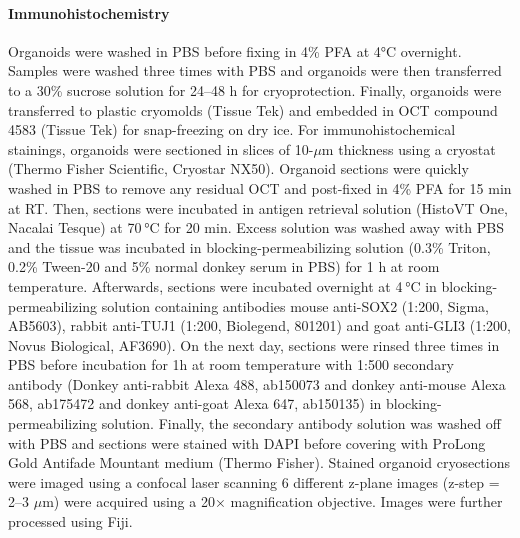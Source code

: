 \paragraph{Immunohistochemistry}
Organoids were washed in PBS before fixing in 4\% PFA at 4°C overnight. Samples were washed three times with PBS and organoids were then transferred to a 30\% sucrose solution for 24–48 h for cryoprotection. Finally, organoids were transferred to plastic cryomolds (Tissue Tek) and embedded in OCT compound 4583 (Tissue Tek) for snap-freezing on dry ice. For immunohistochemical stainings, organoids were sectioned in slices of 10-$\mu$m thickness using a cryostat (Thermo Fisher Scientific, Cryostar NX50). Organoid sections were quickly washed in PBS to remove any residual OCT and post-fixed in 4\% PFA for 15 min at RT. Then, sections were incubated in antigen retrieval solution (HistoVT One, Nacalai Tesque) at 70 °C for 20 min. Excess solution was washed away with PBS and the tissue was incubated in blocking-permeabilizing solution (0.3\% Triton, 0.2\% Tween-20 and 5\% normal donkey serum in PBS) for 1 h at room temperature. Afterwards, sections were incubated overnight at 4 °C in blocking-permeabilizing solution containing antibodies mouse anti-SOX2 (1:200, Sigma, ​​AB5603), rabbit anti-TUJ1 (1:200, Biolegend, 801201) and goat anti-GLI3 (1:200, Novus Biological, AF3690). On the next day, sections were rinsed three times in PBS before incubation for 1h at room temperature with 1:500 secondary antibody (Donkey anti-rabbit Alexa 488, ab150073 and donkey anti-mouse Alexa 568, ab175472 and donkey anti-goat Alexa 647, ab150135) in blocking-permeabilizing solution. Finally, the secondary antibody solution was washed off with PBS and sections were stained with DAPI before covering with ProLong Gold Antifade Mountant medium (Thermo Fisher). Stained organoid cryosections were imaged using a confocal laser scanning 6 different z-plane images (z-step = 2–3 $\mu$m) were acquired using a 20× magnification objective. Images were further processed using Fiji.

